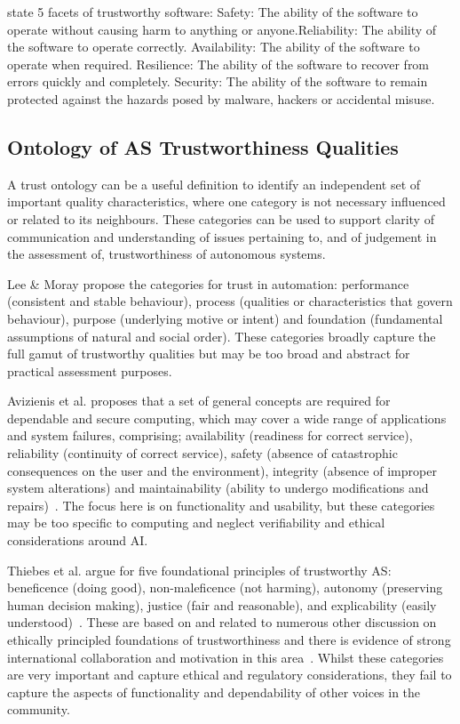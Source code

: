 \cite{ts_foundation} state 5 facets of trustworthy software: Safety: The ability of the software to operate without causing harm to anything or anyone.Reliability: The ability of the software to operate correctly. Availability: The ability of the software to operate when required.
Resilience: The ability of the software to recover from errors quickly and completely. Security: The ability of the software to remain protected against the hazards posed by malware, hackers or accidental misuse.



\subsection{Ontology of AS Trustworthiness Qualities}

A trust ontology can be a useful definition to identify an independent set of important quality characteristics, where one category is not necessary influenced or related to its neighbours. These categories can be used to support clarity of communication and understanding of issues pertaining to, and of judgement in the assessment of, trustworthiness of autonomous systems. 

Lee \& Moray propose the categories for trust in automation: performance (consistent and stable behaviour), process (qualities or characteristics that govern behaviour), purpose (underlying motive or intent) and foundation (fundamental assumptions of natural and social order). These categories broadly capture the full gamut of trustworthy qualities but may be too broad and abstract for practical assessment purposes. 

Avizienis et al. proposes that a set of general concepts are required for dependable and secure computing, which may cover a wide range of applications and system failures, comprising; availability (readiness for correct service), reliability (continuity of correct service), safety (absence of catastrophic consequences on the user and the environment), integrity (absence of improper system alterations) and maintainability (ability to undergo modifications and repairs)~\cite{avizienis2004basic}. The focus here is on functionality and usability, but these categories may be too specific to computing and neglect verifiability and ethical considerations around AI.

Thiebes et al. argue for five foundational principles of trustworthy AS: beneficence (doing good), non-maleficence (not harming), autonomy (preserving human decision making), justice (fair and reasonable), and explicability (easily understood)~\cite{Thiebes2021}. These are based on and related to numerous other discussion on ethically principled foundations of trustworthiness and there is evidence of strong international collaboration and motivation in this area~\cite{Floridi2018,jobin2019global}. Whilst these categories are very important and capture ethical and regulatory considerations, they fail to capture the aspects of functionality and dependability of other voices in the community.

